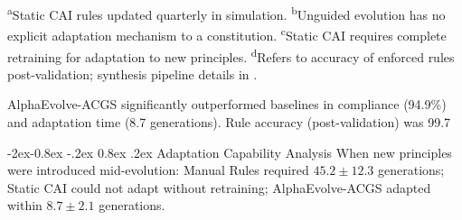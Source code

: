 \documentclass[manuscript,screen,review,anonymous,9pt]{acmart}
\makeatletter
\renewcommand\subsubsection{\@startsection{subsubsection}{3}{\z@}%
  {-2ex\@plus -0.8ex \@minus -.2ex}%
  {0.8ex \@plus .2ex}%
  {\normalfont\normalsize\bfseries}}
\makeatother
\begin{document}
\begin{table}[htbp]
\begin{minipage}{\linewidth}\footnotesize \textsuperscript{a}Static CAI rules updated quarterly in simulation. \textsuperscript{b}Unguided evolution has no explicit adaptation mechanism to a constitution. \textsuperscript{c}Static CAI requires complete retraining for adaptation to new principles. \textsuperscript{d}Refers to accuracy of enforced rules post-validation; synthesis pipeline details in .\end{minipage}
\end{table}
AlphaEvolve-ACGS significantly outperformed baselines in compliance (94.9\%) and adaptation time (8.7 generations). Rule accuracy (post-validation) was 99.7%

\subsubsection{Adaptation Capability Analysis}
When new principles were introduced mid-evolution: Manual Rules required $45.2 \pm 12.3$ generations; Static CAI could not adapt without retraining; AlphaEvolve-ACGS adapted within $8.7 \pm 2.1$ generations.
\end{document}
